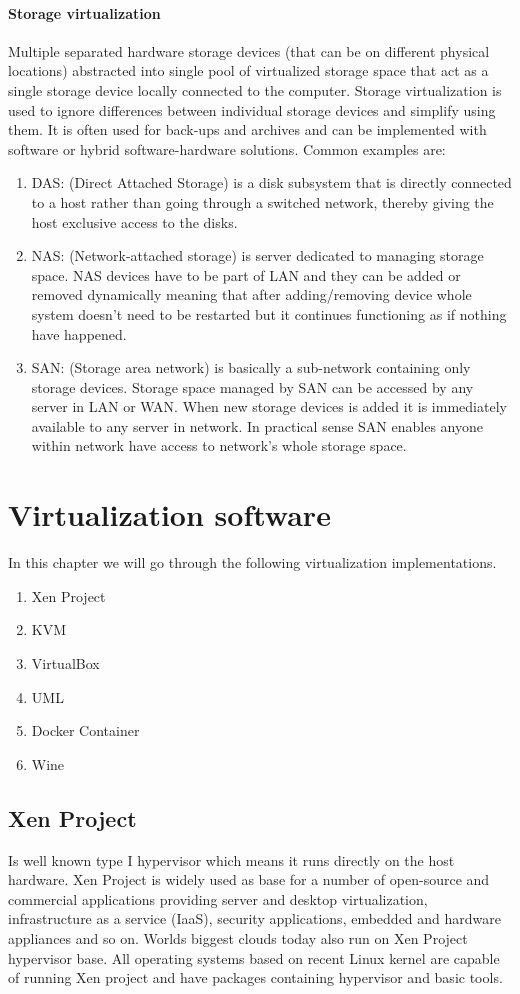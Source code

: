 \subsubsection{Storage virtualization}
Multiple separated hardware storage devices (that can be on different physical locations) abstracted into single pool of virtualized storage space that act as a single storage device locally connected to the computer. Storage virtualization is used to ignore differences between individual storage devices and simplify using them. It is often used for back-ups and archives and can be implemented with software or hybrid software-hardware solutions. Common examples are:
\begin{enumerate}
\item DAS: (Direct Attached Storage) is a disk subsystem that is directly connected to a host rather than going through a switched network, thereby giving the host exclusive access to the disks.
\item NAS: (Network-attached storage) is server dedicated to managing storage space. NAS devices have to be part of LAN and they can be added or removed dynamically meaning that after adding/removing device whole system doesn't need to be restarted but it continues functioning as if nothing have happened.
\item SAN: (Storage area network) is basically a sub-network containing only storage devices. Storage space managed by SAN can be accessed by any server in LAN or WAN. When new storage devices is added it is immediately available to any server in network. In practical sense SAN enables anyone within network have access to network's whole storage space.
\end{enumerate}


\chapter{Virtualization software}
In this chapter we will go through the following virtualization implementations.
\begin{enumerate}
\item Xen Project
\item KVM
\item VirtualBox
\item UML
\item Docker Container
\item Wine
\end{enumerate}

\section{Xen Project} \label{xen}
Is well known type I hypervisor which means it runs directly on the host hardware. Xen Project is widely used as base for a number of open-source and commercial applications providing server and desktop virtualization, infrastructure as a service (IaaS), security applications, embedded and hardware appliances and so on. Worlds biggest clouds today also run on Xen Project hypervisor base. All operating systems based on recent Linux kernel are capable of running Xen project and have packages containing hypervisor and basic tools.

